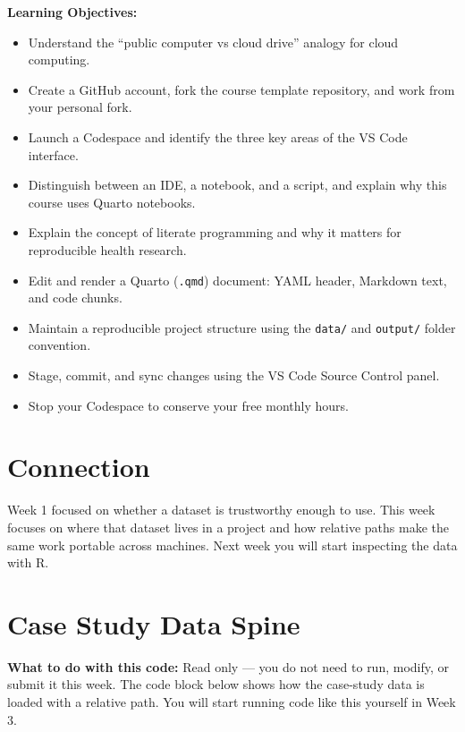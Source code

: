 \documentclass[
  letterpaper,
  DIV=11,
  numbers=noendperiod,
  oneside]{scrreprt}
\providecommand{\tightlist}{%
  \setlength{\itemsep}{0pt}\setlength{\parskip}{0pt}}
\begin{document}
\textbf{Learning Objectives:}

\begin{itemize}
\tightlist
\item
  Understand the ``public computer vs cloud drive'' analogy for cloud
  computing.
\item
  Create a GitHub account, fork the course template repository, and work
  from your personal fork.
\item
  Launch a Codespace and identify the three key areas of the VS Code
  interface.
\item
  Distinguish between an IDE, a notebook, and a script, and explain why
  this course uses Quarto notebooks.
\item
  Explain the concept of literate programming and why it matters for
  reproducible health research.
\item
  Edit and render a Quarto (\texttt{.qmd}) document: YAML header,
  Markdown text, and code chunks.
\item
  Maintain a reproducible project structure using the \texttt{data/} and
  \texttt{output/} folder convention.
\item
  Stage, commit, and sync changes using the VS Code Source Control
  panel.
\item
  Stop your Codespace to conserve your free monthly hours.
\end{itemize}

\section*{Connection}\label{connection-1}


Week 1 focused on whether a dataset is trustworthy enough to use. This
week focuses on where that dataset lives in a project and how relative
paths make the same work portable across machines. Next week you will
start inspecting the data with R.

\section*{Case Study Data Spine}\label{case-study-data-spine-1}


\textbf{What to do with this code:} Read only --- you do not need to
run, modify, or submit it this week. The code block below shows how the
case-study data is loaded with a relative path. You will start running
code like this yourself in Week 3.
\end{document}
